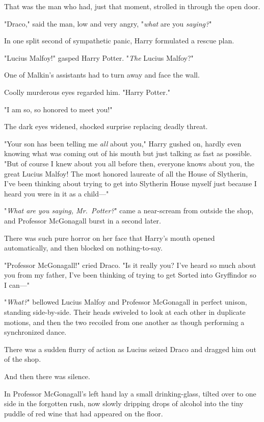 That was the man who had, just that moment, strolled in through the open door.

"Draco," said the man, low and very angry, "\emph{what} are you \emph{saying?}"

In one split second of sympathetic panic, Harry formulated a rescue plan.

"Lucius Malfoy!" gasped Harry Potter. "\emph{The} Lucius Malfoy?"

One of Malkin's assistants had to turn away and face the wall.

Coolly murderous eyes regarded him. "Harry Potter."

"I am so, so honored to meet you!"

The dark eyes widened, shocked surprise replacing deadly threat.

"Your son has been telling me \emph{all} about you," Harry gushed on, hardly
even knowing what was coming out of his mouth but just talking as fast as
possible. "But of course I knew about you all before then, everyone knows about
you, the great Lucius Malfoy! The most honored laureate of all the House of
Slytherin, I've been thinking about trying to get into Slytherin House myself
just because I heard you were in it as a child\mbox{---}"

"\emph{What are you saying, Mr.~Potter?}" came a near-scream from outside the
shop, and Professor McGonagall burst in a second later.

There was such pure horror on her face that Harry's mouth opened automatically,
and then blocked on nothing-to-say.

"Professor McGonagall!" cried Draco. "Is it really you? I've heard so much
about you from my father, I've been thinking of trying to get Sorted into
Gryffindor so I can\mbox{---}"

"\emph{What?}" bellowed Lucius Malfoy and Professor McGonagall in perfect
unison, standing side-by-side. Their heads swiveled to look at each other in
duplicate motions, and then the two recoiled from one another as though
performing a synchronized dance.

There was a sudden flurry of action as Lucius seized Draco and dragged him out
of the shop.

And then there was silence.

In Professor McGonagall's left hand lay a small drinking-glass, tilted over to
one side in the forgotten rush, now slowly dripping drops of alcohol into the
tiny puddle of red wine that had appeared on the floor.


